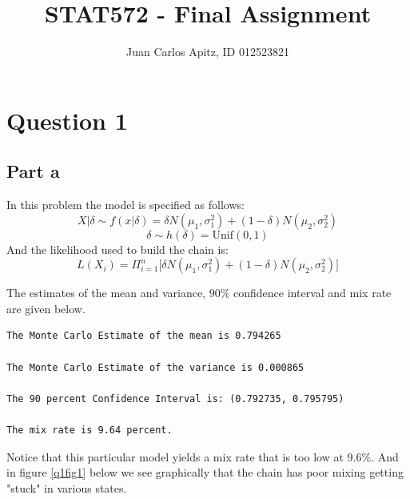 \documentclass[12pt,a4paper]{article}
\author{Juan Carlos Apitz, ID 012523821}
\title{STAT572 - Final Assignment}
\begin{document}
\maketitle
\nocite{*}

\clearpage

\section*{Question 1}

\subsection*{Part a}
In this problem the model is specified as follows:
\[X|\delta\sim f(x|\delta)=\delta N(\mu_1,\sigma_1^2)+(1-\delta)N(\mu_2,\sigma_2^2)\]
\[\delta\sim h(\delta)=\text{Unif}(0,1)\]
And the likelihood used to build the chain is:
\[L(X_i) = \Pi_{i=1}^n\Bigr[\delta N(\mu_1,\sigma_1^2)+(1-\delta)N(\mu_2,\sigma_2^2)\Bigr]\]

The estimates of the mean and variance, $90\%$ confidence interval and mix rate are given below.
\begin{verbatim}
The Monte Carlo Estimate of the mean is 0.794265

The Monte Carlo Estimate of the variance is 0.000865

The 90 percent Confidence Interval is: (0.792735, 0.795795)

The mix rate is 9.64 percent.
\end{verbatim}

Notice that this particular model yields a mix rate that is too low at $9.6\%$. And in figure \ref{q1fig1} below we see graphically that the chain has poor mixing getting "stuck" in various states.  
\end{document}
